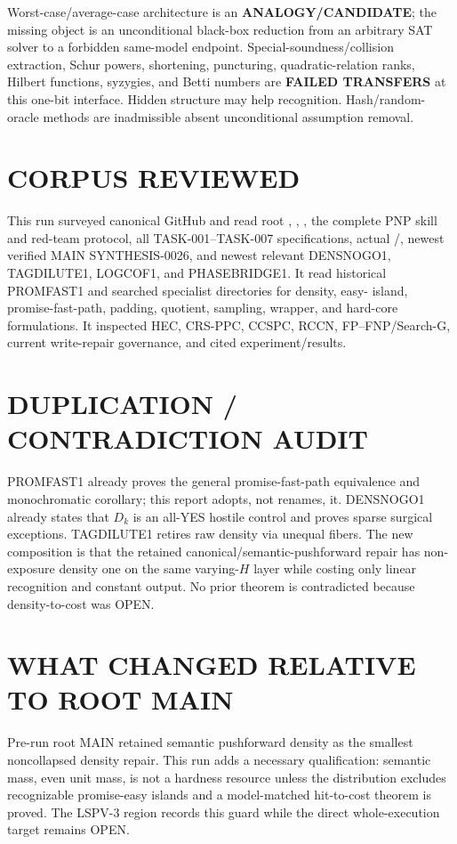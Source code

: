 \documentclass[11pt]{article}
\begin{document}
Worst-case/average-case architecture is an \textbf{ANALOGY/CANDIDATE}; the
missing object is an unconditional black-box reduction from an arbitrary SAT
solver to a forbidden same-model endpoint. Special-soundness/collision
extraction, Schur powers, shortening, puncturing, quadratic-relation ranks,
Hilbert functions, syzygies, and Betti numbers are \textbf{FAILED TRANSFERS}
at this one-bit interface. Hidden structure may help recognition. Hash/random-
oracle methods are inadmissible absent unconditional assumption removal.

\section{CORPUS REVIEWED}
This run surveyed canonical GitHub and read root ,
, , the complete PNP skill and red-team
protocol, all TASK-001--TASK-007 specifications, actual
/, newest verified MAIN SYNTHESIS-0026, and
newest relevant DENSNOGO1, TAGDILUTE1, LOGCOF1, and PHASEBRIDGE1. It read
historical PROMFAST1 and searched specialist directories for density, easy-
island, promise-fast-path, padding, quotient, sampling, wrapper, and hard-core
formulations. It inspected HEC, CRS-PPC, CCSPC, RCCN, FP--FNP/Search-G,
current write-repair governance, and cited experiment/results.

\section{DUPLICATION / CONTRADICTION AUDIT}
PROMFAST1 already proves the general promise-fast-path equivalence and
monochromatic corollary; this report adopts, not renames, it. DENSNOGO1 already
states that \(D_k\) is an all-YES hostile control and proves sparse surgical
exceptions. TAGDILUTE1 retires raw density via unequal fibers. The new
composition is that the retained canonical/semantic-pushforward repair has
non-exposure density one on the same varying-\(H\) layer while costing only
linear recognition and constant output. No prior theorem is contradicted
because density-to-cost was OPEN.

\section{WHAT CHANGED RELATIVE TO ROOT MAIN}
Pre-run root MAIN retained semantic pushforward density as the smallest
noncollapsed density repair. This run adds a necessary qualification:
semantic mass, even unit mass, is not a hardness resource unless the
distribution excludes recognizable promise-easy islands and a model-matched
hit-to-cost theorem is proved. The LSPV-3 region records this guard while the
direct whole-execution target remains OPEN.
\end{document}
